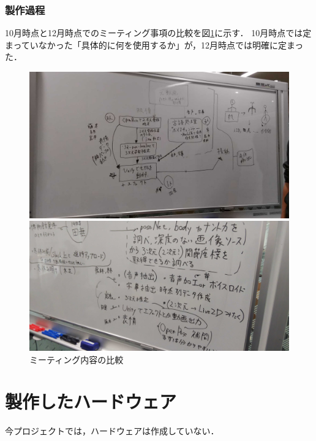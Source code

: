 \documentclass[a4paper,12pt]{jsarticle}
\begin{document}
\subsubsection{製作過程}
10月時点と12月時点でのミーティング事項の比較を図\ref{fig:iw132compare}に示す．
10月時点では定まっていなかった「具体的に何を使用するか」が，12月時点では明確に定まった．

\begin{figure}[h]
  \centering
 \begin{minipage}[b]{0.45\linewidth}
  \centering
  \includegraphics[width=1.0\textwidth]{fig/iw1321.png}
  \end{minipage}
 \begin{minipage}[b]{0.08\linewidth}
  \centering
 \end{minipage}
 \begin{minipage}[b]{0.45\linewidth}
  \centering
  \includegraphics[width=1.0\textwidth]{fig/iw1322.png}
  \end{minipage}
 \caption{ミーティング内容の比較}
 \label{fig:iw132compare}
\end{figure}

\section{製作したハードウェア}
今プロジェクトでは，ハードウェアは作成していない．
\end{document}
